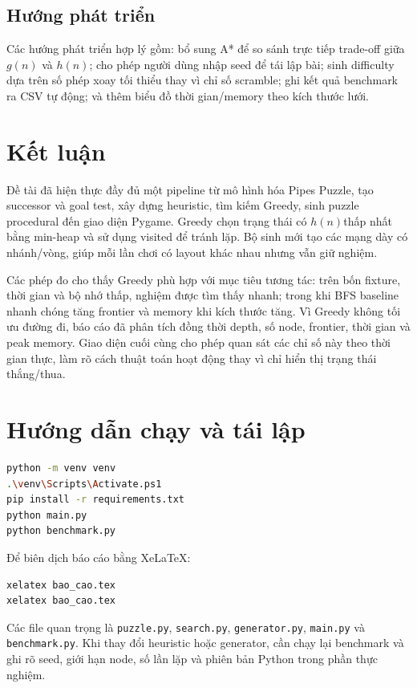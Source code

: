 \documentclass[12pt,a4paper]{article}
\newcommand{\code}[1]{\texttt{#1}}
\newcommand{\Hn}{\ensuremath{h(n)}}
\begin{document}
\subsection{Hướng phát triển}
Các hướng phát triển hợp lý gồm: bổ sung A* để so sánh trực tiếp trade-off giữa \(g(n)\) và \(h(n)\); cho phép người dùng nhập seed để tái lập bài; sinh difficulty dựa trên số phép xoay tối thiểu thay vì chỉ số scramble; ghi kết quả benchmark ra CSV tự động; và thêm biểu đồ thời gian/memory theo kích thước lưới.

\section{Kết luận}
Đề tài đã hiện thực đầy đủ một pipeline từ mô hình hóa Pipes Puzzle, tạo successor và goal test, xây dựng heuristic, tìm kiếm Greedy, sinh puzzle procedural đến giao diện Pygame. Greedy chọn trạng thái có \Hn thấp nhất bằng min-heap và sử dụng visited để tránh lặp. Bộ sinh mới tạo các mạng dày có nhánh/vòng, giúp mỗi lần chơi có layout khác nhau nhưng vẫn giữ nghiệm.

Các phép đo cho thấy Greedy phù hợp với mục tiêu tương tác: trên bốn fixture, thời gian và bộ nhớ thấp, nghiệm được tìm thấy nhanh; trong khi BFS baseline nhanh chóng tăng frontier và memory khi kích thước tăng. Vì Greedy không tối ưu đường đi, báo cáo đã phân tích đồng thời depth, số node, frontier, thời gian và peak memory. Giao diện cuối cùng cho phép quan sát các chỉ số này theo thời gian thực, làm rõ cách thuật toán hoạt động thay vì chỉ hiển thị trạng thái thắng/thua.

\appendix
\section{Hướng dẫn chạy và tái lập}
\begin{lstlisting}[language=bash,caption={Các lệnh chạy project}]
python -m venv venv
.\venv\Scripts\Activate.ps1
pip install -r requirements.txt
python main.py
python benchmark.py
\end{lstlisting}

Để biên dịch báo cáo bằng XeLaTeX:
\begin{lstlisting}[language=bash]
xelatex bao_cao.tex
xelatex bao_cao.tex
\end{lstlisting}

Các file quan trọng là \code{puzzle.py}, \code{search.py}, \code{generator.py}, \code{main.py} và \code{benchmark.py}. Khi thay đổi heuristic hoặc generator, cần chạy lại benchmark và ghi rõ seed, giới hạn node, số lần lặp và phiên bản Python trong phần thực nghiệm.
\end{document}
